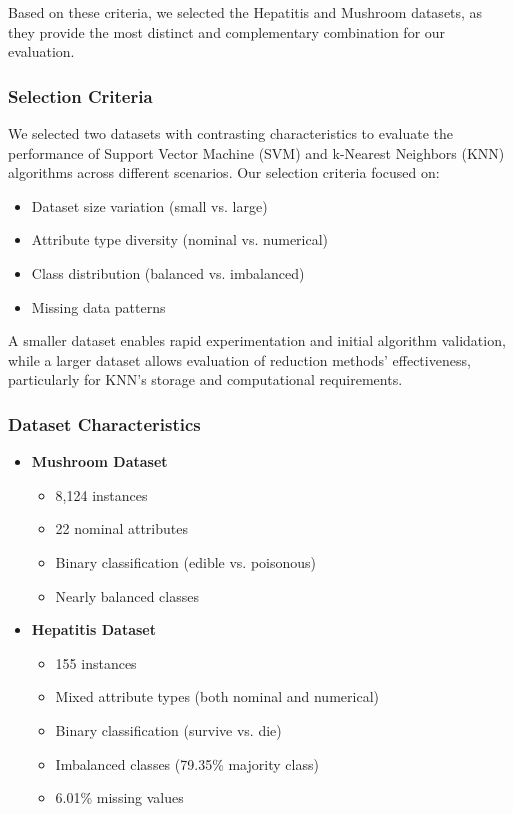 Based on these criteria, we selected the Hepatitis and Mushroom datasets, as they provide the most distinct and complementary combination for our evaluation.
\subsubsection{Selection Criteria}
We selected two datasets with contrasting characteristics to evaluate the performance of Support Vector Machine (SVM) and k-Nearest Neighbors (KNN) algorithms across different scenarios. Our selection criteria focused on:

\begin{itemize}
    \item Dataset size variation (small vs. large)
    \item Attribute type diversity (nominal vs. numerical)
    \item Class distribution (balanced vs. imbalanced)
    \item Missing data patterns
\end{itemize}

A smaller dataset enables rapid experimentation and initial algorithm validation, while a larger dataset allows evaluation of reduction methods' effectiveness, particularly for KNN's storage and computational requirements.

\subsubsection{Dataset Characteristics}

\begin{itemize}
    \item \textbf{Mushroom Dataset}
    \begin{itemize}
        \item 8,124 instances
        \item 22 nominal attributes
        \item Binary classification (edible vs. poisonous)
        \item Nearly balanced classes
    \end{itemize}
    
    \item \textbf{Hepatitis Dataset}
    \begin{itemize}
        \item 155 instances
        \item Mixed attribute types (both nominal and numerical)
        \item Binary classification (survive vs. die)
        \item Imbalanced classes (79.35\% majority class)
        \item 6.01\% missing values
    \end{itemize}
\end{itemize}

